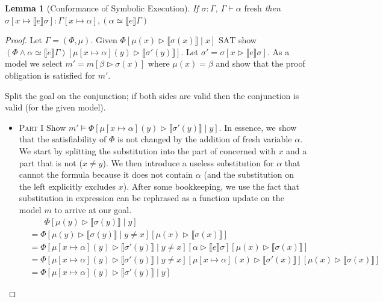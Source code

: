 \documentclass[twoside, english]{sdqthesis}
\newcommand{\bbracket}[1]{\llbracket #1 \rrbracket}
\newcommand{\tr}[0]{\triangleright}
\newtheorem{lemma}[theorem]{Lemma}
\theoremstyle{definition}
\begin{document}
\begin{lemma}[Conformance of Symbolic Execution]\label{lem:conf-sym-exec}
  If \hyperref[def:state-conformance]{$\sigma : \Gamma$}, $\Gamma \vdash \alpha \text{ fresh}$ then $\sigma[x \mapsto \bbracket{e} \sigma] : \Gamma[x \mapsto \alpha],(\alpha \simeq \bbracket{e} \Gamma)$
\end{lemma}
\begin{proof}
  Let $\Gamma = (\Phi, \mu)$. Given $\Phi[ \mu(x) \tr \bbracket{\sigma(x)} \mid x] \text{ SAT}$  show
  $(\Phi \wedge \alpha \simeq \bbracket{e}\Gamma)[\mu[x \mapsto \alpha](y) \tr \bbracket{\sigma'(y)}]$.
  Let $\sigma' = \sigma[x \tr \bbracket{e} \sigma]$.
  As a model we select $m' = m[\beta \tr \sigma(x)]$ where $\mu(x) = \beta$ and show that the proof obligation is satisfied for $m'$.
  
  Split the goal on the conjunction; if both sides are valid then the conjunction is valid (for the given model).
  \begin{itemize}
    \item \textsc{Part I} Show $m' \vDash \Phi[\mu[x \mapsto \alpha](y) \tr \bbracket{\sigma'(y)} \mid y]$.
      In essence, we show that the satisfiability of $\Phi$ is not changed by the addition of fresh variable $\alpha$. We start by splitting the substitution into the part of concerned with $x$ and a part that is not ($x \neq y$). We then introduce a useless substitution for $\alpha$ that cannot the formula because it does not contain $\alpha$ (and the substitution on the left explicitly excludes $x$). After some bookkeeping, we use the fact that substitution in expression can be rephrased as a function update on the model $m$ to arrive at our goal.
      \begin{align*}
          &\phantom{=}\ \ \Phi[\mu(y) \tr \bbracket{\sigma(y)} \mid y]
          \\   &= \Phi[\mu(y) \tr \bbracket{\sigma(y)} \mid y \neq x][\mu(x) \tr \bbracket{\sigma(x)}]
          \\ &= \Phi
            [\mu[x \mapsto \alpha](y) \tr \bbracket{\sigma'(y)} \mid y \neq x]
            [\alpha \tr \bbracket{e} \sigma]
            [\mu(x) \tr \bbracket{\sigma(x)}]
          \\ &= \Phi
            [\mu[x \mapsto \alpha](y) \tr \bbracket{\sigma'(y)} \mid y \neq x]
            [\mu[x\mapsto \alpha](x) \tr \bbracket{\sigma'(x)}]
            [\mu(x) \tr \bbracket{\sigma(x)}]
          \\ &= \Phi
            [\mu[x \mapsto \alpha](y) \tr \bbracket{\sigma'(y)} \mid y]

\end{align*}
\end{itemize}
\end{proof}
\end{document}
